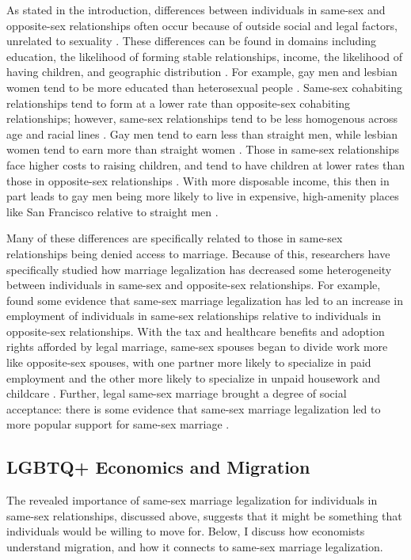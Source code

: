 \documentclass[12pt,letterpaper]{article}
\begin{document}
As stated in the introduction, differences between individuals in same-sex and opposite-sex relationships often occur because of outside social and legal factors, unrelated to sexuality \citep{2}. These differences can be found in domains including education, the likelihood of forming stable relationships, income, the likelihood of having children, and geographic distribution \citep{2, 11, 6, 7, 8, 10, 7}. For example, gay men and lesbian women tend to be more educated than heterosexual people \citep{2, 7, 11}. Same-sex cohabiting relationships tend to form at a lower rate than opposite-sex cohabiting relationships; however, same-sex relationships tend to be less homogenous across age and racial lines \citep{2, 7}. Gay men tend to earn less than straight men, while lesbian women tend to earn more than straight women \citep{6}. Those in same-sex relationships face higher costs to raising children, and tend to have children at lower rates than those in opposite-sex relationships \citep{8, 10, 11}. With more disposable income, this then in part leads to gay men being more likely to live in expensive, high-amenity places like San Francisco relative to straight men \citep{7, 10, 11, 13}. 

Many of these differences are specifically related to those in same-sex relationships being denied access to marriage. Because of this, researchers have specifically studied how marriage legalization has decreased some heterogeneity between individuals in same-sex and opposite-sex relationships. For example,\citet{3} found some evidence that same-sex marriage legalization has led to an increase in employment of individuals in same-sex relationships relative to individuals in opposite-sex relationships. With the tax and healthcare benefits and adoption rights afforded by legal marriage, same-sex spouses began to divide work more like opposite-sex spouses, with one partner more likely to specialize in paid employment and the other more likely to specialize in unpaid housework and childcare \citep{3, 4, 6}. Further, legal same-sex marriage brought a degree of social acceptance: there is some evidence that same-sex marriage legalization led to more popular support for same-sex marriage \citep{3, 21}. 

\subsection{LGBTQ+ Economics and Migration}
The revealed importance of same-sex marriage legalization for individuals in same-sex relationships, discussed above, suggests that it might be something that individuals would be willing to move for. Below, I discuss how economists understand migration, and how it connects to same-sex marriage legalization.
\end{document}
